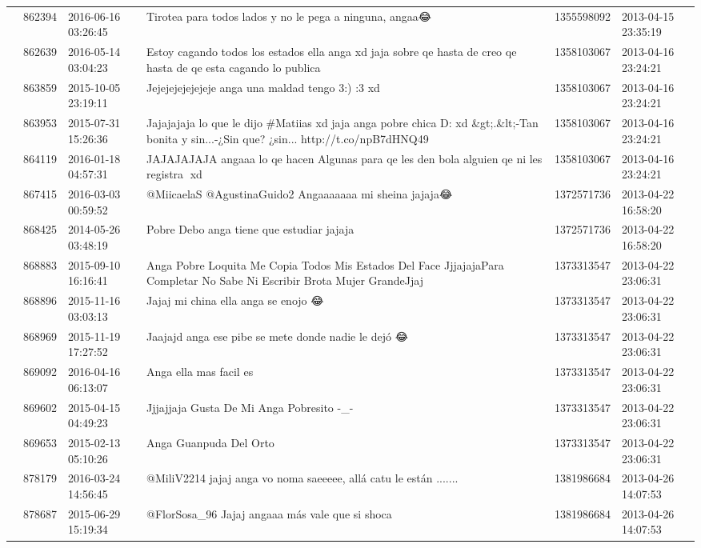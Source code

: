 \begin{tabular}{llllrl}
 & 862394& 2016-06-16 03:26:45 &Tirotea para todos lados y no le pega a ninguna, angaa😂 &1355598092 & 2013-04-15 23:35:19 \\
 & 862639& 2016-05-14 03:04:23 & Estoy cagando todos los estados ella anga xd jaja sobre qe hasta de creo qe hasta de qe esta cagando lo publica󾍄 &1358103067 & 2013-04-16 23:24:21 \\
 & 863859& 2015-10-05 23:19:11 & Jejejejejejejeje anga una maldad tengo 3:) :3 xd &1358103067 & 2013-04-16 23:24:21 \\
 & 863953& 2015-07-31 15:26:36 & Jajajajaja lo que le dijo \#Matiias xd jaja anga pobre chica D: xd \&gt;.\&lt;-Tan bonita y sin...-¿Sin que? ¿sin... http://t.co/npB7dHNQ49 &1358103067 & 2013-04-16 23:24:21 \\
 & 864119& 2016-01-18 04:57:31 &JAJAJAJAJA angaaa lo qe hacen Algunas para qe les den bola alguien qe ni les registra 󾮟xd󾌴󾌴 &1358103067 & 2013-04-16 23:24:21 \\
 & 867415& 2016-03-03 00:59:52 &@MiicaelaS @AgustinaGuido2 Angaaaaaaa mi sheina jajaja😂 &1372571736 & 2013-04-22 16:58:20 \\
 & 868425& 2014-05-26 03:48:19 &Pobre Debo anga tiene que estudiar jajaja &1372571736 & 2013-04-22 16:58:20 \\
 & 868883& 2015-09-10 16:16:41 & Anga Pobre Loquita Me Copia Todos Mis Estados Del Face JjjajajaPara Completar No Sabe Ni Escribir Brota Mujer GrandeJjaj &1373313547 & 2013-04-22 23:06:31 \\
 & 868896& 2015-11-16 03:03:13 &Jajaj mi china ella anga se enojo 😂 &1373313547 & 2013-04-22 23:06:31 \\
 & 868969& 2015-11-19 17:27:52 &Jaajajd anga ese pibe se mete donde nadie le dejó 😂 &1373313547 & 2013-04-22 23:06:31 \\
 & 869092& 2016-04-16 06:13:07 & Anga ella mas facil es &1373313547 & 2013-04-22 23:06:31 \\
 & 869602& 2015-04-15 04:49:23 & Jjjajjaja Gusta De Mi Anga Pobresito -\_- &1373313547 & 2013-04-22 23:06:31 \\
 & 869653& 2015-02-13 05:10:26 & Anga Guanpuda Del Orto &1373313547 & 2013-04-22 23:06:31 \\
 & 878179& 2016-03-24 14:56:45 &@MiliV2214 jajaj anga vo noma saeeeee, allá catu le están ....... &1381986684 & 2013-04-26 14:07:53 \\
 & 878687& 2015-06-29 15:19:34 &@FlorSosa\_96 Jajaj angaaa más vale que si shoca &1381986684 & 2013-04-26 14:07:53 \\

\end{tabular}
